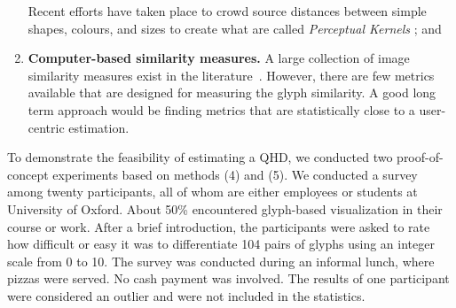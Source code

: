 \begin{enumerate}
Recent efforts have taken place to crowd source distances between simple shapes, colours, and sizes to create what are called \emph{Perceptual Kernels} \cite{demiralplearning}; and
\vspace{-2mm}
\item \textbf{Computer-based similarity measures.} A large collection of image similarity measures exist in the literature~\cite{Sahasrabudhe99, Eler08}.
However, there are few metrics available that are designed for measuring the glyph similarity.
A good long term approach would be finding metrics that are statistically close to a user-centric estimation.
\end{enumerate}

To demonstrate the feasibility of estimating a QHD, we conducted two proof-of-concept experiments based on methods (4) and (5).
We conducted a survey among twenty participants, all of whom are either employees or students at University of Oxford.
About 50\% encountered glyph-based visualization in their course or work.
After a brief introduction, the participants were asked to rate how difficult or easy it was to differentiate 104 pairs of glyphs using an integer scale from 0 to 10.
The survey was conducted during an informal lunch, where pizzas were served.
No cash payment was involved.
The results of one participant were considered an outlier and were not included in the statistics.

